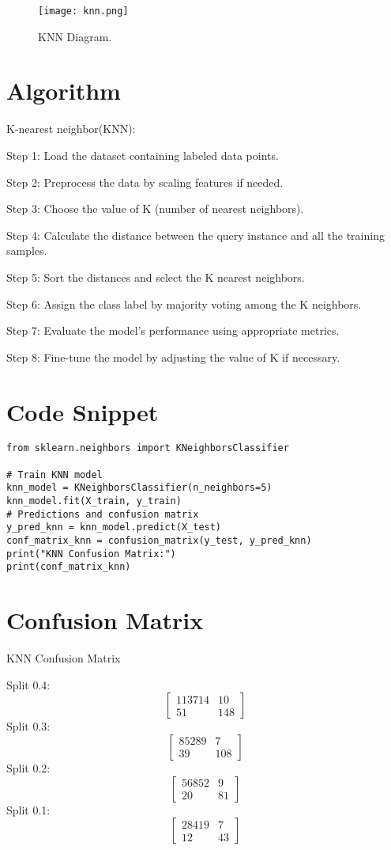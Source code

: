 \documentclass[12pt,a4paper]{report}
\begin{document}
\begin{figure}[ht]
  \centering
 \texttt{[image: knn.png]}
  \caption{KNN Diagram.}
\end{figure}



\section{Algorithm}
K-nearest neighbor(KNN):\par
Step 1: Load the dataset containing labeled data points.\par
Step 2: Preprocess the data by scaling features if needed.\par
Step 3: Choose the value of K (number of nearest neighbors).\par
Step 4: Calculate the distance between the query instance and all the training samples.\par
Step 5: Sort the distances and select the K nearest neighbors.\par
Step 6: Assign the class label by majority voting among the K neighbors.\par
 Step 7: Evaluate the model's performance using appropriate metrics.\par
 Step 8: Fine-tune the model by adjusting the value of K if necessary.

\section{Code Snippet}
\begin{lstlisting}
from sklearn.neighbors import KNeighborsClassifier
 
# Train KNN model
knn_model = KNeighborsClassifier(n_neighbors=5)
knn_model.fit(X_train, y_train)
# Predictions and confusion matrix
y_pred_knn = knn_model.predict(X_test)
conf_matrix_knn = confusion_matrix(y_test, y_pred_knn)
print("KNN Confusion Matrix:")
print(conf_matrix_knn)

\end{lstlisting}

\section{Confusion Matrix}
KNN Confusion Matrix\par
\vspace{0.5cm}
Split 0.4:
\[
\begin{bmatrix}
  113714 & 10\\
  51 & 148
\end{bmatrix}
\]
Split 0.3:
\[
\begin{bmatrix}
   85289 & 7\\
  39 & 108
\end{bmatrix}
\]
Split 0.2:
\[
\begin{bmatrix}
  56852 & 9\\
  20 & 81
\end{bmatrix}
\]
Split 0.1:
\[
\begin{bmatrix}
  28419 & 7\\
  12 & 43
\end{bmatrix}
\]
\end{document}

